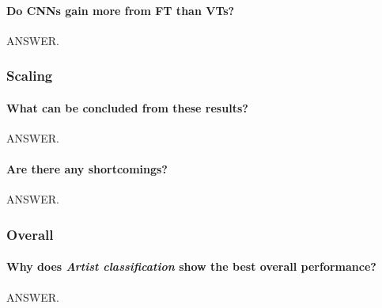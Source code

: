 

\paragraph{Do CNNs gain more from FT than VTs?} ANSWER.

\subsubsection{Scaling}

\paragraph{What can be concluded from these results?} ANSWER.

\paragraph{Are there any shortcomings?} ANSWER.

\subsubsection{Overall}

\paragraph{Why does \textit{Artist classification} show the best overall performance?} ANSWER.

